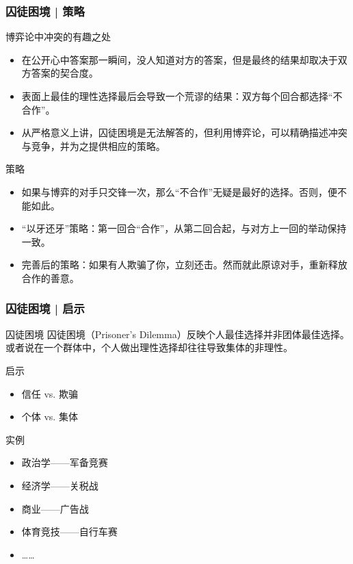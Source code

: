\begin{frame}
  \frametitle{囚徒困境 | 策略}
  \begin{block}{博弈论中冲突的有趣之处}
    \begin{itemize}
      \item 在公开心中答案那一瞬间，没人知道对方的答案，但是最终的结果却取决于双方答案的契合度。
      \item 表面上最佳的理性选择最后会导致一个荒谬的结果：双方每个回合都选择“不合作”。
      \item 从严格意义上讲，囚徒困境是无法解答的，但利用博弈论，可以精确描述冲突与竞争，并为之提供相应的策略。
    \end{itemize}
  \end{block}
  \vspace{-0.3em}
  \pause
  \begin{block}{\alert{策略}}
    \begin{itemize}
      \item 如果与博弈的对手只交锋一次，那么“不合作”无疑是最好的选择。否则，便不能如此。
      \item “以牙还牙”策略：第一回合“合作”，从第二回合起，与对方上一回的举动保持一致。
      \item 完善后的策略：如果有人欺骗了你，立刻还击。然而就此原谅对手，重新释放合作的善意。
    \end{itemize}
  \end{block}
\end{frame}

\begin{frame}
  \frametitle{囚徒困境 | 启示}
  \begin{block}{囚徒困境}
    囚徒困境（Prisoner's Dilemma）反映个人最佳选择并非团体最佳选择。或者说在一个群体中，个人做出理性选择却往往导致集体的非理性。
  \end{block}
  \pause
  \begin{block}{启示}
    \begin{itemize}
      \item 信任 vs. 欺骗 
      \item 个体 vs. 集体
    \end{itemize}
  \end{block}
  \pause
  \begin{block}{实例}
    \begin{itemize}
      \item 政治学——军备竞赛
      \item 经济学——关税战
      \item 商业——广告战
      \item 体育竞技——自行车赛
      \item ……
    \end{itemize}
  \end{block}
\end{frame}

